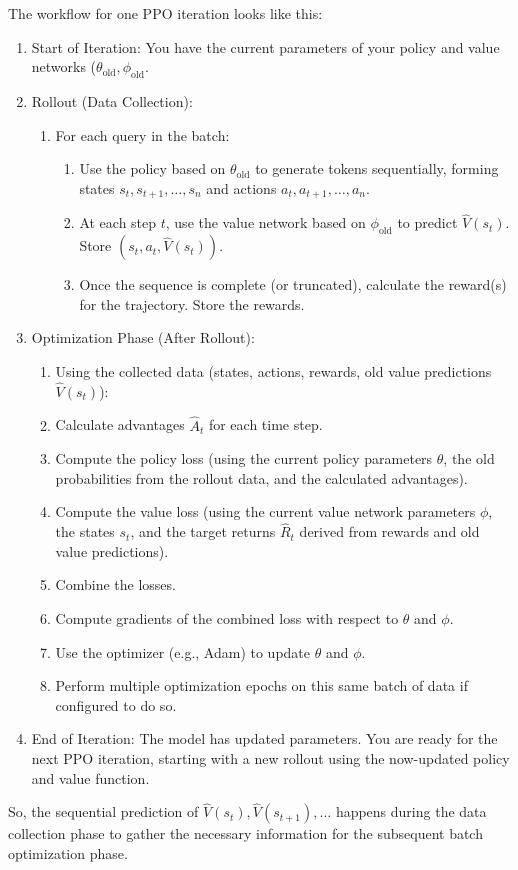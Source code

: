 \documentclass[10pt,a4paper]{report}
\begin{document}
The workflow for one PPO iteration looks like this:
\begin{enumerate}
\item    Start of Iteration: You have the current parameters of your policy and value networks ($\theta_{\text{old}}, \phi_{\text{old}}$.
\item    Rollout (Data Collection):
         \begin{enumerate}
         \item    For each query in the batch:
         \begin{enumerate}
         \item    Use the policy based on $\theta_{\text{old}}$ to generate tokens sequentially, forming states $s_t, s_{t+1}, \dots, s_n$ and actions $a_t, a_{t+1}, \dots, a_n$.
         \item    At each step $t$, use the value network based on $\phi_{\text{old}}$ to predict $\hat{V}(s_t)$. Store $(s_t, a_t, \hat{V}(s_t))$.
         \item    Once the sequence is complete (or truncated), calculate the reward(s) for the trajectory. Store the rewards.
        \end{enumerate}
        \end{enumerate}
\item    Optimization Phase (After Rollout):
        \begin{enumerate}
        \item Using the collected data (states, actions, rewards, old value predictions $\hat{V}(s_t)$):
        \item Calculate advantages $\hat{A}_t$ for each time step.
        \item Compute the policy loss (using the current policy parameters $\theta$, the old probabilities from the rollout data, and the calculated advantages).
        \item Compute the value loss (using the current value network parameters $\phi$, the states $s_t$, and the target returns $\hat{R}_t$ derived from rewards and old value predictions).
        \item Combine the losses.
        \item Compute gradients of the combined loss with respect to $\theta$ and $\phi$.
        \item Use the optimizer (e.g., Adam) to update $\theta$ and $\phi$.
        \item Perform multiple optimization epochs on this same batch of data if configured to do so.
        \end{enumerate}
\item    End of Iteration: The model has updated parameters. You are ready for the next PPO iteration, starting with a new rollout using the now-updated policy and value function.
\end{enumerate}
So, the sequential prediction of $\hat{V}(s_t), \hat{V}(s_{t+1}), \dots$ happens during the data collection phase to gather the necessary information for the subsequent batch optimization phase.
\end{document}
